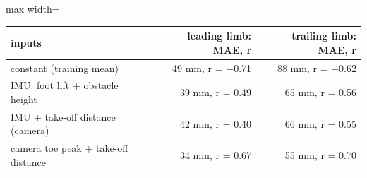 \begin{adjustbox}{max width=\textwidth}
{\footnotesize
\begin{tabular}{lrr}
\toprule
\textbf{inputs} & \textbf{leading limb: MAE, r} & \textbf{trailing limb: MAE, r} \\
\midrule
constant (training mean) & 49 mm, r = $-$0.71 & 88 mm, r = $-$0.62 \\
IMU: foot lift + obstacle height & 39 mm, r = 0.49 & 65 mm, r = 0.56 \\
IMU + take-off distance (camera) & 42 mm, r = 0.40 & 66 mm, r = 0.55 \\
camera toe peak + take-off distance & 34 mm, r = 0.67 & 55 mm, r = 0.70 \\
\bottomrule
\end{tabular}
}
\end{adjustbox}
